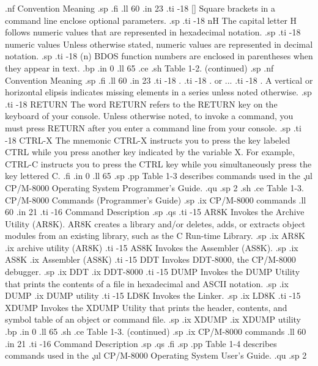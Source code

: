 .nf
     Convention                       Meaning
.sp
.fi
.ll 60
.in 23
.ti -18
[]                Square brackets in a command line enclose optional 
parameters.
.sp
.ti -18
nH                The capital letter H follows numeric values that are 
represented in hexadecimal notation.
.sp
.ti -18
numeric values    Unless otherwise stated, numeric values are represented in 
decimal notation.
.sp
.ti -18
(n)               BDOS function numbers are enclosed in parentheses when they 
appear in text.
.bp
.in 0 
.ll 65
.ce
.sh
Table 1-2.  (continued)
.sp 
.nf
     Convention                       Meaning
.sp
.fi
.ll 60
.in 23
.ti -18
 .
.ti -18
 .  or ...
.ti -18
 .                A vertical or horizontal elipsis indicates missing elements 
in a series unless noted otherwise.
.sp
.ti -18
RETURN            The word RETURN refers to the RETURN key on the keyboard of 
your console.  Unless otherwise noted, to invoke a command, you must press 
RETURN after you enter a command line from your console. 
.sp
.ti -18
CTRL-X            The mnemonic CTRL-X instructs you to press the key labeled 
CTRL while you press another key indicated by the variable X.  For example, 
CTRL-C instructs you to press the CTRL key while you simultaneously press the 
key lettered C.  
.fi
.in 0
.ll 65
.sp 
.pp
Table 1-3 describes commands used in the \c
.ul
CP/M-8000 Operating System Programmer's Guide.
.qu
.sp 2
.sh
.ce
Table 1-3.  CP/M-8000 Commands (Programmer's Guide)
.sp
.ix CP/M-8000 commands
.ll 60
.in 21
.ti -16
Command                        Description
.sp
.qs
.ti -15     
AR8K           Invokes the Archive Utility (AR8K).  AR8K creates a
library and/or deletes, adds, or extracts object modules from an
existing library, such as the C Run-time Library. 
.sp
.ix AR8K
.ix archive utility (AR8K)
.ti -15
AS8K           Invokes the Assembler (AS8K).
.sp 
.ix AS8K
.ix Assembler (AS8K)
.ti -15
DDT            Invokes DDT-8000, the CP/M-8000 debugger.
.sp
.ix DDT
.ix DDT-8000
.ti -15
DUMP           Invokes the DUMP Utility that prints the contents of a file 
in hexadecimal and ASCII notation.
.sp
.ix DUMP
.ix DUMP utility
.ti -15
LD8K           Invokes the Linker. 
.sp
.ix LD8K
.ti -15
XDUMP           Invokes the XDUMP Utility that prints the header, 
contents, and symbol table of an object or command file.
.sp
.ix XDUMP
.ix XDUMP utility
.bp
.in 0
.ll 65
.sh
.ce
Table 1-3.  (continued)
.sp
.ix CP/M-8000 commands
.ll 60
.in 21
.ti -16
Command                        Description
.sp
.qs
.fi
.sp
.pp
Table 1-4 describes commands used in the \c
.ul
CP/M-8000 Operating System User's Guide.
.qu
.sp 2
